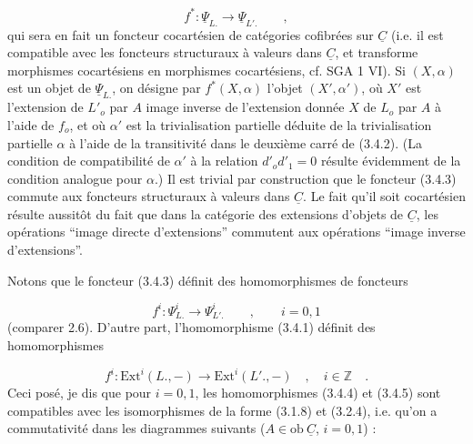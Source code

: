 \begin{equation}\tag{3.4.3}
f^* : \underline{\Psi}_{L.} \longrightarrow \underline{\Psi}_{L'.} \qquad ,
\end{equation}
qui sera en fait un foncteur cocartésien de catégories cofibrées sur $\underline{C}$ (i.e. il est compatible avec les foncteurs structuraux à valeurs dans $\underline{C}$, et transforme morphismes cocartésiens en morphismes cocartésiens, cf. SGA 1 VI). Si $(X,\alpha)$ est un objet de $\underline{\Psi}_{L.}$, on désigne par $f^*(X,\alpha)$ l'objet
$(X',\alpha')$, où $X'$ est l'extension de $L'_o$ par $A$ image inverse de l'extension donnée $X$ de $L_o$ par $A$ à l'aide de $f_o$, et où $\alpha'$ est la trivialisation partielle déduite de la trivialisation partielle $\alpha$ à l'aide de la transitivité dans le deuxième carré de (3.4.2). (La condition de compatibilité de $\alpha'$ à la relation $d'_o d'_1 = 0$ résulte évidemment de la condition analogue pour $\alpha$.) Il est trivial par construction que le foncteur (3.4.3) commute aux foncteurs structuraux à valeurs dans $\underline{C}$. Le fait qu'il soit cocartésien résulte aussitôt du fait que dans la catégorie des extensions d'objets de $\underline{C}$, les opérations ``image directe d'extensions'' commutent aux opérations ``image inverse d'extensions''.

Notons que le foncteur (3.4.3) définit des homomorphismes de foncteurs

\begin{equation}\tag{3.4.4}
f^i : \Psi^i_{L.} \longrightarrow \Psi^i_{L'.} \qquad , \qquad i=0,1
\end{equation}
(comparer 2.6). D'autre part, l'homomorphisme (3.4.1) définit des homomorphismes

\begin{equation}\tag{3.4.5}
f^i : \mathrm{Ext}^i(L.,-) \longrightarrow \mathrm{Ext}^i(L'.,-) \quad , \quad i \in \mathbb{Z} \quad .
\end{equation}
Ceci posé, je dis que pour $i=0,1$, les homomorphismes (3.4.4) et (3.4.5) sont compatibles avec les isomorphismes de la forme (3.1.8) et (3.2.4), i.e. qu'on a commutativité dans les diagrammes suivants ($A \in \mathrm{ob}\ \underline{C}$, $i=0,1$) :

